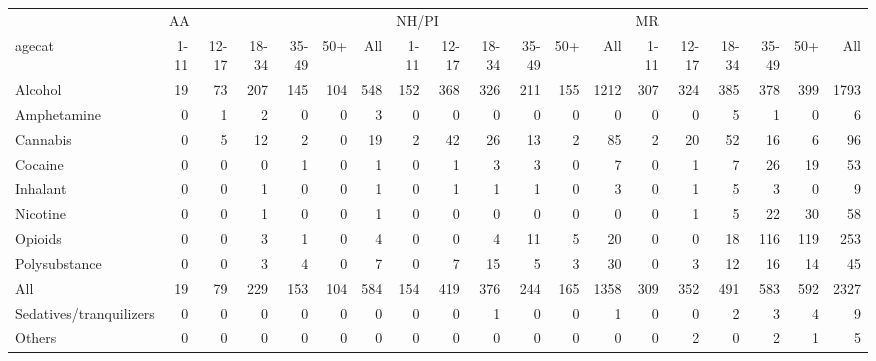 \begin{tabular}{lrrrrrrrrrrrrrrrrrr}
\toprule
{} & \multicolumn{6}{l}{AA} & \multicolumn{6}{l}{NH/PI} & \multicolumn{6}{l}{MR} \\
agecat & 1-11 & 12-17 & 18-34 & 35-49 & 50+ & All &  1-11 & 12-17 & 18-34 & 35-49 & 50+ &  All & 1-11 & 12-17 & 18-34 & 35-49 &  50+ &   All \\
\midrule
Alcohol                 &   19 &    73 &   207 &   145 & 104 & 548 &   152 &   368 &   326 &   211 & 155 & 1212 &  307 &   324 &   385 &   378 &  399 &  1793 \\
Amphetamine             &    0 &     1 &     2 &     0 &   0 &   3 &     0 &     0 &     0 &     0 &   0 &    0 &    0 &     0 &     5 &     1 &    0 &     6 \\
Cannabis                &    0 &     5 &    12 &     2 &   0 &  19 &     2 &    42 &    26 &    13 &   2 &   85 &    2 &    20 &    52 &    16 &    6 &    96 \\
Cocaine                 &    0 &     0 &     0 &     1 &   0 &   1 &     0 &     1 &     3 &     3 &   0 &    7 &    0 &     1 &     7 &    26 &   19 &    53 \\
Inhalant                &    0 &     0 &     1 &     0 &   0 &   1 &     0 &     1 &     1 &     1 &   0 &    3 &    0 &     1 &     5 &     3 &    0 &     9 \\
Nicotine                &    0 &     0 &     1 &     0 &   0 &   1 &     0 &     0 &     0 &     0 &   0 &    0 &    0 &     1 &     5 &    22 &   30 &    58 \\
Opioids                 &    0 &     0 &     3 &     1 &   0 &   4 &     0 &     0 &     4 &    11 &   5 &   20 &    0 &     0 &    18 &   116 &  119 &   253 \\
Polysubstance           &    0 &     0 &     3 &     4 &   0 &   7 &     0 &     7 &    15 &     5 &   3 &   30 &    0 &     3 &    12 &    16 &   14 &    45 \\
All                     &   19 &    79 &   229 &   153 & 104 & 584 &   154 &   419 &   376 &   244 & 165 & 1358 &  309 &   352 &   491 &   583 &  592 &  2327 \\
Sedatives/tranquilizers &    0 &     0 &     0 &     0 &   0 &   0 &     0 &     0 &     1 &     0 &   0 &    1 &    0 &     0 &     2 &     3 &    4 &     9 \\
Others                  &    0 &     0 &     0 &     0 &   0 &   0 &     0 &     0 &     0 &     0 &   0 &    0 &    0 &     2 &     0 &     2 &    1 &     5 \\
\bottomrule
\end{tabular}

